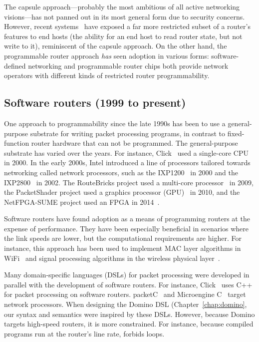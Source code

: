 The capsule approach---probably the most ambitious of all active networking
visions---has not panned out in its most general form due to security concerns.
However, recent systems~\cite{int} have exposed a far more restricted subset of
a router's features to end hosts (\eg the ability for an end host to read
router state, but not write to it), reminiscent of the capsule approach.  On
the other hand, the programmable router approach {\em has} seen adoption in
various forms: software-defined networking and programmable router chips both
provide network operators with different kinds of restricted router
programmability.

\subsection{Software routers (1999 to present)}
One approach to programmability since the late 1990s has been to use a
general-purpose substrate for writing packet processing programs, in contrast
to fixed-function router hardware that can not be programmed. The
general-purpose substrate has varied over the years. For instance,
Click~\cite{click} used a single-core CPU in 2000.  In the early 2000s, Intel
introduced a line of processors tailored towards networking called network
processors, such as the IXP1200~\cite{ixp1200} in 2000 and the
IXP2800~\cite{ixp2800} in 2002.  The RouteBricks project used a multi-core
processor~\cite{routebricks} in 2009, the PacketShader project used a graphics
processor (GPU)~\cite{packetshader} in 2010, and the NetFPGA-SUME project used
an FPGA in 2014~\cite{netfpga}.

Software routers have found adoption as a means of programming routers at the
expense of performance. They have been especially beneficial in scenarios where
the link speeds are lower, but the computational requirements are higher.  For
instance, this approach has been used to implement MAC layer algorithms in
WiFi~\cite{samplerate, roofnet, xor} and signal processing algorithms in the
wireless physical layer~\cite{sora, cloudiq}.

Many domain-specific languages (DSLs) for packet processing were developed in
parallel with the development of software routers. For instance,
Click~\cite{click} uses C++ for packet processing on software routers.
packetC~\cite{packetc} and Microengine C~\cite{microenginec} target network
processors. When designing the Domino DSL (Chapter~\ref{chap:domino}, our
syntax and semantics were inspired by these DSLs.  However, because Domino
targets high-speed routers, it is more constrained. For instance, because
compiled programs run at the router's line rate, \pktlanguage forbids loops.

